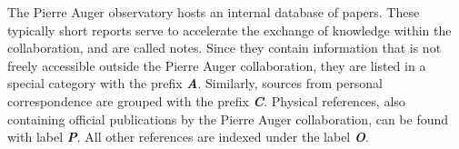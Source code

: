 
\let\chapter=\prepostchapter
\pagestyle{plain}

\printbibheading

The Pierre Auger observatory hosts an internal database of papers. These 
typically short reports serve to accelerate the exchange of knowledge within the
collaboration, and are called \GAP notes. Since they contain information that is
not freely accessible outside the Pierre Auger collaboration, they are listed in
a special category with the prefix \textbf{\textit{A}}. Similarly, sources from 
personal correspondence are grouped with the prefix \textbf{\textit{C}}. 
Physical references, also containing official publications by the Pierre Auger 
collaboration, can be found with label \textbf{\textit{P}}. All other references
are indexed under the label \textbf{\textit{O}}.

\newrefcontext[labelprefix=C]
\printbibliography[keyword={private},title={Personal Correspondence},heading=subbibliography]

\newrefcontext[labelprefix=A]
\printbibliography[keyword={GAP-Note},title={GAP Notes},heading=subbibliography]

\newrefcontext[labelprefix=P]
\printbibliography[keyword={phys},notkeyword={GAP-Note},title={Physics References},heading=subbibliography]

\newrefcontext[labelprefix=O]
\printbibliography[notkeyword={phys},notkeyword={GAP-Note},title={Other References},heading=subbibliography]

\cleardoublepage